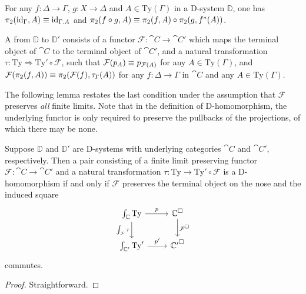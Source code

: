 \begin{rmk}
For any $f:\Delta\to\Gamma$, $g:X\to\Delta$ and $A\in\mathrm{Ty}(\Gamma)$ in a
D-system $\mathbb{D}$, one has 
$\pi_2(\catid{\Gamma},A)\jdeq\catid{\ctxext{\Gamma}{A}}$ and
$\pi_2(f\circ g,A)\equiv \pi_2(f,A)\circ\pi_2(g,f^\ast(A))$.
\end{rmk}

\begin{defn}
A  from $\mathbb{D}$ to $\mathbb{D}'$ consists of a functor 
$\mathcal{F}:\cat{C}\to\cat{C}'$ which maps the terminal object of
$\cat{C}$ to the terminal object of $\cat{C}'$, and a natural transformation
$\tau:\mathrm{Ty}\Rightarrow\mathrm{Ty}'\circ\mathcal{F}$, such that 
$\mathcal{F}(p_A)\equiv p_{\mathcal{F}(A)}$ for any
$A\in\mathrm{Ty}(\Gamma)$, and $\mathcal{F}(\pi_2(f,A))\equiv
\pi_2(\mathcal{F}(f),\tau_\Gamma(A))$ for any $f:\Delta\to\Gamma$ in $\cat{C}$ and
any $A\in\mathrm{Ty}(\Gamma)$. 
\end{defn}

The following lemma restates the last condition under the assumption that
$\mathcal{F}$ preserves \emph{all} finite limits. Note that
in the definition of D-homomorphism, the underlying functor is only
required to preserve the pullbacks of the projections, of which there may be
none.

\begin{lem}
Suppose $\mathbb{D}$ and $\mathbb{D}'$ are D-systems with underlying categories
$\cat{C}$ and $\cat{C}'$, respectively. Then a pair consisting of a finite
limit preserving functor
$\mathcal{F}:\cat{C}\to\cat{C}'$ and a natural transformation
$\tau:\mathrm{Ty}\to \mathrm{Ty'}\circ\mathcal{F}$ is a D-homomorphism if and
only if $\mathcal{F}$ preserves the terminal object on the nose and the induced
square
\begin{equation*}
\begin{tikzcd}
\int_{\cat{C}}\mathrm{Ty} \arrow[r,"p"] \arrow[d,swap,"{\int_{\mathcal{F}}\tau}"] & \cat{C}^{\square} \arrow[d,"\mathcal{F}^\square"] \\
\int_{\cat{C}'}\mathrm{Ty}' \arrow[r,"{p'}"] & {\cat{C}'}^\square
\end{tikzcd}
\end{equation*}
commutes.
\end{lem}

\begin{proof}
Straightforward.
\end{proof}


